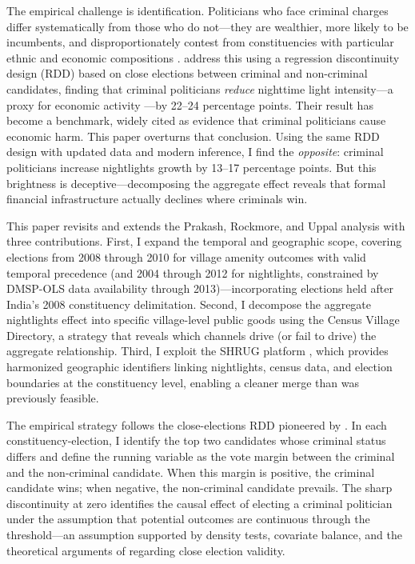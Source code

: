 \documentclass[12pt]{article}
\begin{document}
The empirical challenge is identification. Politicians who face criminal charges differ systematically from those who do not---they are wealthier, more likely to be incumbents, and disproportionately contest from constituencies with particular ethnic and economic compositions \citep{vaishnav2017,george2020}. \citet{prakash2019} address this using a regression discontinuity design (RDD) based on close elections between criminal and non-criminal candidates, finding that criminal politicians \textit{reduce} nighttime light intensity---a proxy for economic activity \citep{henderson2012}---by 22--24 percentage points. Their result has become a benchmark, widely cited as evidence that criminal politicians cause economic harm. This paper overturns that conclusion. Using the same RDD design with updated data and modern inference, I find the \textit{opposite}: criminal politicians increase nightlights growth by 13--17 percentage points. But this brightness is deceptive---decomposing the aggregate effect reveals that formal financial infrastructure actually declines where criminals win.

This paper revisits and extends the Prakash, Rockmore, and Uppal analysis with three contributions. First, I expand the temporal and geographic scope, covering elections from 2008 through 2010 for village amenity outcomes with valid temporal precedence (and 2004 through 2012 for nightlights, constrained by DMSP-OLS data availability through 2013)---incorporating elections held after India's 2008 constituency delimitation. Second, I decompose the aggregate nightlights effect into specific village-level public goods using the Census Village Directory, a strategy that reveals which channels drive (or fail to drive) the aggregate relationship. Third, I exploit the SHRUG platform \citep{asher2021shrug}, which provides harmonized geographic identifiers linking nightlights, census data, and election boundaries at the constituency level, enabling a cleaner merge than was previously feasible.

The empirical strategy follows the close-elections RDD pioneered by \citet{lee2008}. In each constituency-election, I identify the top two candidates whose criminal status differs and define the running variable as the vote margin between the criminal and the non-criminal candidate. When this margin is positive, the criminal candidate wins; when negative, the non-criminal candidate prevails. The sharp discontinuity at zero identifies the causal effect of electing a criminal politician under the assumption that potential outcomes are continuous through the threshold---an assumption supported by density tests, covariate balance, and the theoretical arguments of \citet{eggers2015} regarding close election validity.
\end{document}
